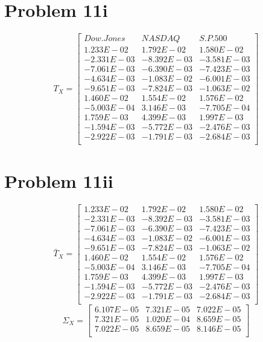 \documentclass{article}
\begin{document}
\section*{Problem 11i}
\begin{equation*}
T_X = 
\begin{bmatrix}{}
 Dow.Jones & NASDAQ & S.P.500 \\ 
 1.233E-02 & 1.792E-02 & 1.580E-02 \\ 
  -2.331E-03 & -8.392E-03 & -3.581E-03 \\ 
  -7.061E-03 & -6.390E-03 & -7.423E-03 \\ 
  -4.634E-03 & -1.083E-02 & -6.001E-03 \\ 
  -9.651E-03 & -7.824E-03 & -1.063E-02 \\ 
  1.460E-02 & 1.554E-02 & 1.576E-02 \\ 
  -5.003E-04 & 3.146E-03 & -7.705E-04 \\ 
  1.759E-03 & 4.399E-03 & 1.997E-03 \\ 
  -1.594E-03 & -5.772E-03 & -2.476E-03 \\ 
  -2.922E-03 & -1.791E-03 & -2.684E-03 \\ 
  \end{bmatrix}
\end{equation*}

\section*{Problem 11ii}
\begin{equation*}
\bar{T}_X= \begin{bmatrix}{}
1.233E-02 & 1.792E-02 & 1.580E-02 \\
  -2.331E-03 & -8.392E-03 & -3.581E-03 \\
-7.061E-03 & -6.390E-03 & -7.423E-03 \\
 -4.634E-03 & -1.083E-02 & -6.001E-03 \\
 -9.651E-03 & -7.824E-03 & -1.063E-02 \\
  1.460E-02 & 1.554E-02 & 1.576E-02 \\
-5.003E-04 & 3.146E-03 & -7.705E-04 \\
  1.759E-03 & 4.399E-03 & 1.997E-03 \\
  -1.594E-03 & -5.772E-03 & -2.476E-03 \\
-2.922E-03 & -1.791E-03 & -2.684E-03 \\
\end{bmatrix}
\end{equation*}
\begin{equation*}
\Sigma_X=\begin{bmatrix}{}
  6.107E-05 & 7.321E-05 & 7.022E-05 \\ 
  7.321E-05 & 1.020E-04 & 8.659E-05 \\ 
  7.022E-05 & 8.659E-05 & 8.146E-05 \\ 
  \end{bmatrix}
\end{equation*}
\end{document}
